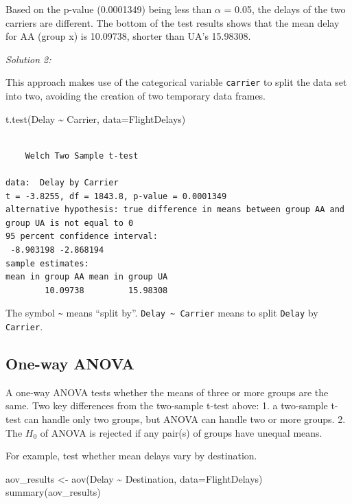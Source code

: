 \documentclass[
  letterpaper,
  DIV=11,
  numbers=noendperiod]{scrreprt}
\newenvironment{Shaded}{\begin{snugshade}}{\end{snugshade}}
\newcommand{\AttributeTok}[1]{\textcolor[rgb]{0.40,0.45,0.13}{#1}}
\newcommand{\FunctionTok}[1]{\textcolor[rgb]{0.28,0.35,0.67}{#1}}
\newcommand{\NormalTok}[1]{\textcolor[rgb]{0.00,0.23,0.31}{#1}}
\newcommand{\OtherTok}[1]{\textcolor[rgb]{0.00,0.23,0.31}{#1}}
\newcommand{\SpecialCharTok}[1]{\textcolor[rgb]{0.37,0.37,0.37}{#1}}
\begin{document}
Based on the p-value (0.0001349) being less than \(\alpha\) = 0.05, the
delays of the two carriers are different. The bottom of the test results
shows that the mean delay for AA (group x) is 10.09738, shorter than
UA's 15.98308.

\emph{Solution 2:}

This approach makes use of the categorical variable \texttt{carrier} to
split the data set into two, avoiding the creation of two temporary data
frames.

\begin{Shaded}
\begin{Highlighting}[]
\FunctionTok{t.test}\NormalTok{(Delay }\SpecialCharTok{\textasciitilde{}}\NormalTok{ Carrier, }\AttributeTok{data=}\NormalTok{FlightDelays)}
\end{Highlighting}
\end{Shaded}

\begin{verbatim}

    Welch Two Sample t-test

data:  Delay by Carrier
t = -3.8255, df = 1843.8, p-value = 0.0001349
alternative hypothesis: true difference in means between group AA and group UA is not equal to 0
95 percent confidence interval:
 -8.903198 -2.868194
sample estimates:
mean in group AA mean in group UA 
        10.09738         15.98308 
\end{verbatim}

The symbol \texttt{\textasciitilde{}} means ``split by''.
\texttt{Delay\ \textasciitilde{}\ Carrier} means to split \texttt{Delay}
by \texttt{Carrier}.

\subsection{One-way ANOVA}\label{sec-04-one-way-ANOVA}

A one-way ANOVA tests whether the means of three or more groups are the
same. Two key differences from the two-sample t-test above: 1. a
two-sample t-test can handle only two groups, but ANOVA can handle two
or more groups. 2. The \(H_{0}\) of ANOVA is rejected if any pair(s) of
groups have unequal means.

For example, test whether mean delays vary by destination.

\begin{Shaded}
\begin{Highlighting}[]
\NormalTok{aov\_results }\OtherTok{\textless{}{-}} \FunctionTok{aov}\NormalTok{(Delay }\SpecialCharTok{\textasciitilde{}}\NormalTok{ Destination, }\AttributeTok{data=}\NormalTok{FlightDelays)}
\FunctionTok{summary}\NormalTok{(aov\_results)}
\end{Highlighting}
\end{Shaded}
\end{document}
